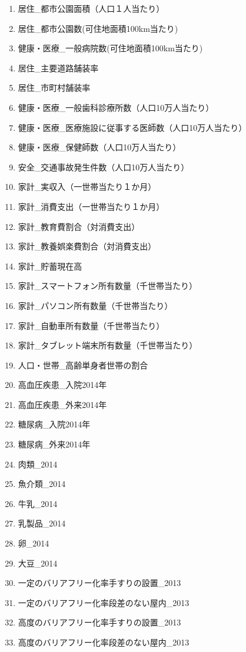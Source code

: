 \begin{multicols}{2}
\begin{enumerate}
  \item  居住\_都市公園面積（人口１人当たり）
  \item  居住\_都市公園数(可住地面積100km当たり)
  \item  健康・医療\_一般病院数(可住地面積100km当たり)
  \item  居住\_主要道路舗装率
  \item  居住\_市町村舗装率
  \item  健康・医療\_一般歯科診療所数（人口10万人当たり）
  \item  健康・医療\_医療施設に従事する医師数（人口10万人当たり）
  \item  健康・医療\_保健師数（人口10万人当たり）
  \item  安全\_交通事故発生件数（人口10万人当たり）
  \item  家計\_実収入（一世帯当たり１か月）
  \item  家計\_消費支出（一世帯当たり１か月）
  \item  家計\_教育費割合（対消費支出）
  \item  家計\_教養娯楽費割合（対消費支出）
  \item  家計\_貯蓄現在高
  \item  家計\_スマートフォン所有数量（千世帯当たり）
  \item  家計\_パソコン所有数量（千世帯当たり）
  \item  家計\_自動車所有数量（千世帯当たり）
  \item  家計\_タブレット端末所有数量（千世帯当たり）
  \item  人口・世帯\_高齢単身者世帯の割合
  \item  高血圧疾患\_入院2014年
  \item  高血圧疾患\_外来2014年
  \item  糖尿病\_入院2014年
  \item  糖尿病\_外来2014年
  \item  肉類\_2014
  \item  魚介類\_2014
  \item  牛乳\_2014
  \item  乳製品\_2014
  \item  卵\_2014
  \item  大豆\_2014
  \item  一定のバリアフリー化率手すりの設置\_2013
  \item  一定のバリアフリー化率段差のない屋内\_2013
  \item  高度のバリアフリー化率手すりの設置\_2013
  \item  高度のバリアフリー化率段差のない屋内\_2013

\end{enumerate}
\end{multicols}
